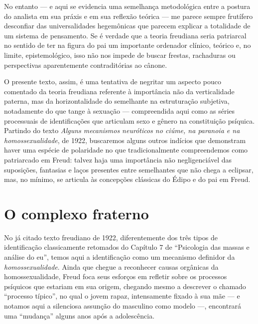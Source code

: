 No entanto --- e aqui se evidencia uma semelhança metodológica entre a
postura do analista em sua práxis e em sua reflexão teórica --- me
parece sempre frutífero desconfiar das universalidades hegemônicas que
parecem explicar a totalidade de um sistema de pensamento. Se é verdade
que a teoria freudiana seria patriarcal no sentido de ter na figura do
pai um importante ordenador clínico, teórico e, no limite,
epistemológico, isso não nos impede de buscar frestas, rachaduras ou
perspectivas aparentemente contraditórias ao cânone.

O presente texto, assim, é uma tentativa de negritar um aspecto pouco
comentado da teoria freudiana referente à importância não da
verticalidade paterna, mas da horizontalidade do semelhante na
estruturação subjetiva, notadamente do que tange à sexuação ---
compreendida aqui como as séries processuais de identificações que
articulam sexo e gênero na constituição psíquica. Partindo do texto
\emph{Alguns mecanismos neuróticos no ciúme, na paranoia e na
homossexualidade}, de 1922, buscaremos alguns outros indícios que
demonstram haver uma espécie de polaridade no que tradicionalmente
compreendemos como patriarcado em Freud: talvez haja uma importância não
negligenciável das suposições, fantasias e laços presentes entre
semelhantes que não chega a eclipsar, mas, no mínimo, se articula às
concepções clássicas do Édipo e do pai em Freud.

\section{O complexo fraterno}

No já citado texto freudiano de 1922, diferentemente dos três tipos de
identificação classicamente retomados do Capítulo 7 de ``Psicologia das
massas e análise do eu'', temos aqui a identificação como um mecanismo
definidor da \emph{homossexualidade}. Ainda que chegue a reconhecer
causas orgânicas da homossexualidade, Freud foca seus esforços em
refletir sobre os processos psíquicos que estariam em sua origem,
chegando mesmo a descrever o chamado ``processo típico'', no qual o
jovem rapaz, intensamente fixado à sua mãe --- e notamos aqui a
silenciosa assunção do masculino como modelo ---, encontrará uma
``mudança'' alguns anos após a adolescência.

